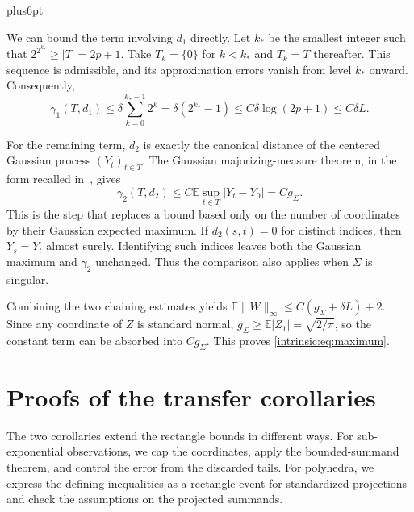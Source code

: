 \documentclass[11pt,letterpaper,twoside,leqno]{article}
\makeatletter
\theoremstyle{bookplain}
\theoremstyle{bookremark}
\renewenvironment{proof}[1][\proofname]{\par
  \pushQED{\qed}\normalfont\topsep6pt plus6pt\relax
  \trivlist\item[\hskip\labelsep\bfseries #1\@addpunct{.}]\ignorespaces
}{\popQED\endtrivlist\@endpefalse}
\newcommand{\E}{\mathbb E}
\makeatother
\begin{document}
\begin{proof}
We can bound the term involving $d_1$ directly.
Let $k_*$ be the smallest integer such that
$2^{2^{k_*}}\ge|T|=2p+1$.
Take $T_k=\{0\}$ for $k<k_*$ and $T_k=T$ thereafter.
This sequence is admissible, and its approximation errors vanish
from level $k_*$ onward. Consequently,
\[
 \gamma_1(T,d_1)
 \le\delta\sum_{k=0}^{k_*-1}2^k
 =\delta(2^{k_*}-1)
 \le C\delta\log(2p+1)\le C\delta L.
\]

For the remaining term, $d_2$ is exactly the canonical distance
of the centered Gaussian process $(Y_t)_{t\in T}$.
The Gaussian majorizing-measure theorem, in the form recalled
in~\cite[Remark~3.3(i)]{Dirksen2015}, gives
\[
 \gamma_2(T,d_2)
 \le C\E\sup_{t\in T}|Y_t-Y_0|=Cg_\Sigma.
\]
This is the step that replaces a bound based only on the number of
coordinates by their Gaussian expected maximum.
If $d_2(s,t)=0$ for distinct indices, then $Y_s=Y_t$ almost surely.
Identifying such indices leaves both the Gaussian maximum and
$\gamma_2$ unchanged. Thus the comparison also applies when
$\Sigma$ is singular.

Combining the two chaining estimates yields
$\E\|W\|_\infty\le C(g_\Sigma+\delta L)+2$.
Since any coordinate of $Z$ is standard normal,
$g_\Sigma\ge\E|Z_1|=\sqrt{2/\pi}$, so the constant term can be
absorbed into $Cg_\Sigma$. This proves
\eqref{intrinsic:eq:maximum}.
\end{proof}


\section{Proofs of the transfer corollaries}\label{app:transfers}

The two corollaries extend the rectangle bounds in different ways.
For sub-exponential observations, we cap the coordinates, apply the
bounded-summand theorem, and control the error from the discarded tails.
For polyhedra, we express the defining inequalities as a rectangle
event for standardized projections and check the assumptions on the
projected summands.
\end{document}
